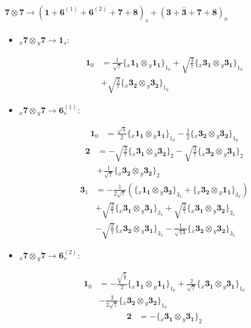 \documentclass[english]{article}
\newcommand{\cgEqFontsize}{\large}
\newcommand{\rep}[1]{\mathbf{#1}}
\newcommand{\repx}[2]{{}_{#2}\mathbf{#1}}
\newcommand{\tsprod}[2]{\rep{#1}\otimes\rep{#2}}
\newcommand{\tsprodx}[2]{\repx{#1}{x}\otimes\repx{#2}{y}}
\newcommand{\subcgs}[3]{\big\{ \tsprodx{#1}{#2}\big\}^{}_{#3}}
\begin{document}
\paragraph*{\cgEqFontsize $\tsprod{7}{7}\to\left(\rep{1}+\rep{6}^{(1)}+\rep{6}^{(2)}+\rep{7}+\rep{8}\right)_s+\left(\rep{3}+\rep{\bar{3}}+\rep{7}+\rep{8}\right)_a$}
\begin{itemize}
\item $\tsprodx{7}{7}\to\rep{1}_{s}$:
\begin{fleqn}
\begin{align*}
\rep{1}_{0} & = \frac{1}{\sqrt{7}}\subcgs{1_{1}}{1_{1}}{1_{0}}+\sqrt{\frac{3}{7}}\subcgs{3_{1}}{3_{1}}{1_{0}} \\ 
 & +\sqrt{\frac{3}{7}}\subcgs{3_{2}}{3_{2}}{1_{0}}
\end{align*}
\end{fleqn}
\item $\tsprodx{7}{7}\to\rep{6}_{s}^{(1)}$:
\begin{fleqn}
\begin{align*}
\rep{1}_{0} & = \frac{\sqrt{3}}{2}\subcgs{1_{1}}{1_{1}}{1_{0}}-\frac{1}{2}\subcgs{3_{2}}{3_{2}}{1_{0}}
\end{align*}
\begin{align*}
\rep{2} & = -\sqrt{\frac{3}{7}}\subcgs{3_{1}}{3_{2}}{2}-\sqrt{\frac{3}{7}}\subcgs{3_{2}}{3_{1}}{2} \\ 
 & +\frac{1}{\sqrt{7}}\subcgs{3_{2}}{3_{2}}{2}
\end{align*}
\begin{align*}
\rep{3}_{1} & = -\frac{1}{2 \sqrt{7}}\left(\subcgs{1_{1}}{3_{2}}{3_{1}}+\subcgs{3_{2}}{1_{1}}{3_{1}}\right) \\ 
 & +\sqrt{\frac{2}{7}}\subcgs{3_{1}}{3_{1}}{3_{1}}+\sqrt{\frac{2}{7}}\subcgs{3_{1}}{3_{2}}{3_{1}} \\ 
 & -\sqrt{\frac{2}{7}}\subcgs{3_{2}}{3_{1}}{3_{1}}-\frac{1}{\sqrt{14}}\subcgs{3_{2}}{3_{2}}{3_{1}}
\end{align*}
\end{fleqn}
\item $\tsprodx{7}{7}\to\rep{6}_{s}^{(2)}$:
\begin{fleqn}
\begin{align*}
\rep{1}_{0} & = -\frac{\sqrt{\frac{3}{7}}}{2}\subcgs{1_{1}}{1_{1}}{1_{0}}+\frac{2}{\sqrt{7}}\subcgs{3_{1}}{3_{1}}{1_{0}} \\ 
 & -\frac{3}{2 \sqrt{7}}\subcgs{3_{2}}{3_{2}}{1_{0}}
\end{align*}
\begin{align*}
\rep{2} & = -\subcgs{3_{1}}{3_{1}}{2}

\end{align*}
\end{fleqn}
\end{itemize}
\end{document}

